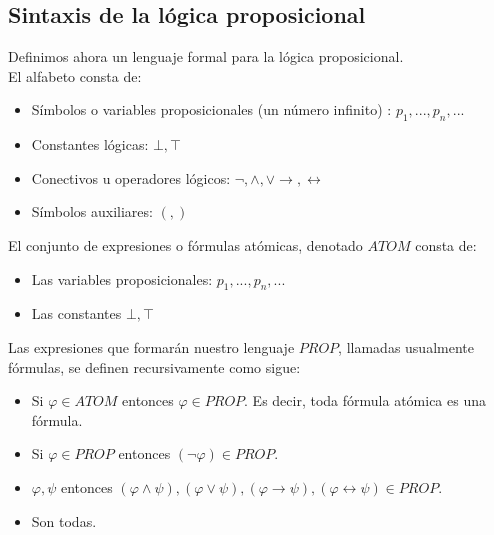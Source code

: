\documentclass[letterpaper,12pt]{article}
\begin{document}
    \subsection{Sintaxis de la lógica proposicional}
    Definimos ahora un lenguaje formal para la lógica proposicional. \\
    El alfabeto consta de:
    \begin{itemize}
        \item Símbolos o variables proposicionales (un número 
        infinito) : $p_{1}, ... , p_{n}, ...$
        \item Constantes lógicas: $\bot, \top$
        \item Conectivos u operadores lógicos: $\neg, \land, \lor 
        \rightarrow, \leftrightarrow$
        \item Símbolos auxiliares: $(,)$
    \end{itemize}

    El conjunto de expresiones o fórmulas atómicas, denotado $ATOM$ consta de:
    \begin{itemize}
        \item Las variables proposicionales: $p_{1}, ..., p_{n}, ...$
        \item Las constantes $\bot, \top$
    \end{itemize}
    
    Las expresiones que formarán nuestro lenguaje $PROP$, llamadas usualmente
    fórmulas, se definen recursivamente como sigue: 
    \begin{itemize}
        \item Si $\varphi \in ATOM$ entonces $\varphi \in PROP$. Es decir,
        toda fórmula atómica es una fórmula.
        \item Si $\varphi \in PROP$ entonces $(\neg \varphi) \in PROP$.
        \item $\varphi, \psi$ entonces $(\varphi \land \psi), 
        (\varphi \lor \psi), (\varphi \rightarrow \psi), 
        (\varphi \leftrightarrow \psi) \in PROP$.
        \item Son todas.
    \end{itemize}
\end{document}
